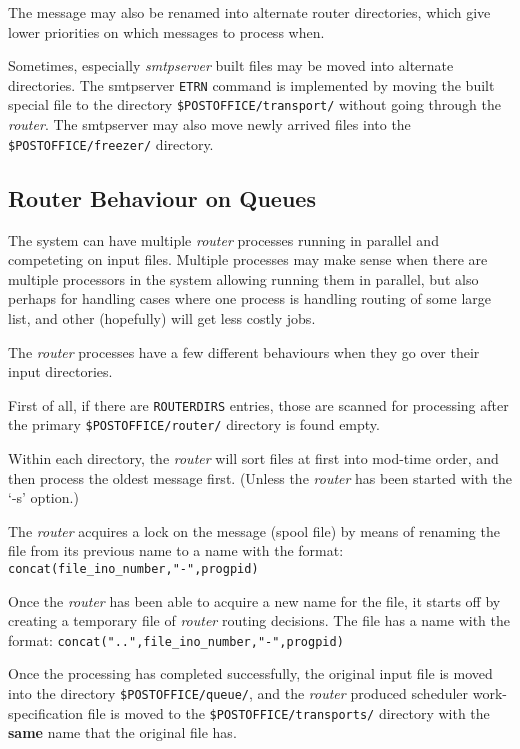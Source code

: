 The message may also be renamed into alternate router directories, 
which give lower priorities on which messages to process when.

Sometimes, especially {\em smtpserver} built files may be moved
into alternate directories. The smtpserver {\tt ETRN}
command is implemented by moving the built special file to the 
directory {\tt \$POSTOFFICE/transport/} without going through the
{\em router}.  The smtpserver may also move newly arrived
files into the {\tt \$POSTOFFICE/freezer/} directory.




\subsection{Router Behaviour on Queues}

The system can have multiple {\em router} processes running in parallel
and competeting on input files.  Multiple processes may make sense when
there are multiple processors in the system allowing running them in
parallel, but also perhaps for handling cases where one process is handling
routing of some large list, and other (hopefully) will get less costly jobs.

The {\em router} processes have a few different behaviours when
they go over their input directories.

First of all, if there are {\tt ROUTERDIRS} entries, those
are scanned for processing after the primary 
{\tt \$POSTOFFICE/router/} directory is found empty.

Within each directory, the {\em router} will sort files at first into 
mod-time order, and then process the oldest message first. (Unless the 
{\em router} has been started with the `-s' option.)

The {\em router} acquires a lock on the message (spool file) by means
of renaming the file from its previous name to a name with the format: 
{\small\tt concat(file\_ino\_number,"-",progpid)}

Once the {\em router} has been able to acquire a new name
for the file, it starts off by creating a temporary file of
{\em router} routing decisions.  The file has a name with the format:
{\small\tt concat("..",file\_ino\_number,"-",progpid)}

Once the processing has completed successfully, the original
input file is moved into the directory {\tt \$POSTOFFICE/queue/}, and
the {\em router} produced scheduler work-specification file is moved
to the {\tt \$POSTOFFICE/transports/} directory with the {\bf same}
name that the original file has.

